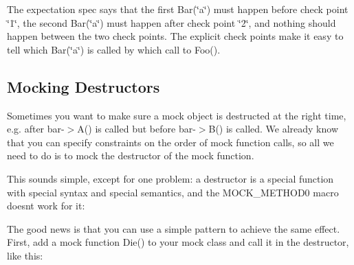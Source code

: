 \begin{DoxyCode}{0}
\DoxyCodeLine{}
\DoxyCodeLine{  \{}
\DoxyCodeLine{}
\DoxyCodeLine{  \}}
\DoxyCodeLine{\}}
\end{DoxyCode}


The expectation spec says that the first {\ttfamily Bar(\char`\"{}a\char`\"{})} must happen before check point \char`\"{}1\char`\"{}, the second {\ttfamily Bar(\char`\"{}a\char`\"{})} must happen after check point \char`\"{}2\char`\"{}, and nothing should happen between the two check points. The explicit check points make it easy to tell which {\ttfamily Bar(\char`\"{}a\char`\"{})} is called by which call to {\ttfamily Foo()}.

\subsection*{Mocking Destructors}

Sometimes you want to make sure a mock object is destructed at the right time, e.\+g. after {\ttfamily bar-\/$>$A()} is called but before {\ttfamily bar-\/$>$B()} is called. We already know that you can specify constraints on the order of mock function calls, so all we need to do is to mock the destructor of the mock function.

This sounds simple, except for one problem\+: a destructor is a special function with special syntax and special semantics, and the {\ttfamily M\+O\+C\+K\+\_\+\+M\+E\+T\+H\+O\+D0} macro doesn\textquotesingle{}t work for it\+:


\begin{DoxyCode}{0}
\end{DoxyCode}


The good news is that you can use a simple pattern to achieve the same effect. First, add a mock function {\ttfamily Die()} to your mock class and call it in the destructor, like this\+:


